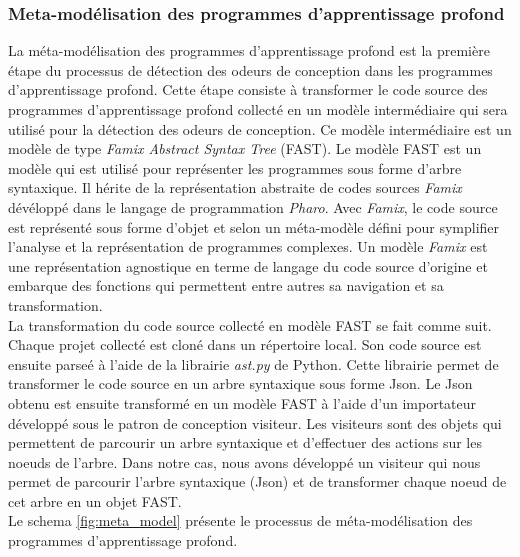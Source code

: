 \subsubsection{Meta-modélisation des programmes d'apprentissage profond}
\label{sec:Meta-modélisation des programmes d'apprentissage profond}
La méta-modélisation des programmes d'apprentissage profond est la première
étape du processus de détection des odeurs de conception dans les programmes
d'apprentissage profond. Cette étape consiste à transformer le code source des programmes
d'apprentissage profond collecté en un modèle intermédiaire qui sera utilisé pour la
détection des odeurs de conception. Ce modèle intermédiaire est un modèle de
type \emph{Famix Abstract Syntax Tree} (FAST). Le modèle FAST est un modèle qui
est utilisé pour représenter les programmes sous forme d'arbre syntaxique. Il
hérite de la représentation abstraite de codes sources \emph{Famix} dévéloppé
dans le langage de programmation \emph{Pharo}. Avec \emph{Famix}, le code
source est représenté sous forme d'objet et selon un méta-modèle défini pour symplifier l'analyse et
la représentation de programmes complexes. Un modèle \emph{Famix} est une
représentation agnostique en terme de langage du code source d'origine et embarque des
fonctions qui permettent entre autres sa navigation et sa transformation.\\

La transformation du code source collecté en modèle FAST se fait comme suit.
Chaque projet collecté est cloné dans un répertoire local. Son code source est
ensuite parseé à l'aide de la librairie \emph{ast.py} de Python. Cette librairie
permet de transformer le code source en un arbre syntaxique sous forme Json. Le
Json obtenu est ensuite transformé en un modèle FAST à l'aide d'un importateur
développé sous le patron de conception visiteur. Les visiteurs sont des objets
qui permettent de parcourir un arbre syntaxique et d'effectuer des actions sur
les noeuds de l'arbre. Dans notre cas, nous avons développé un visiteur qui nous
permet de parcourir l'arbre syntaxique (Json) et de transformer chaque noeud de
cet arbre en un objet FAST.\\

Le schema \ref{fig:meta_model} présente le processus de méta-modélisation des
programmes d'apprentissage profond.\\

